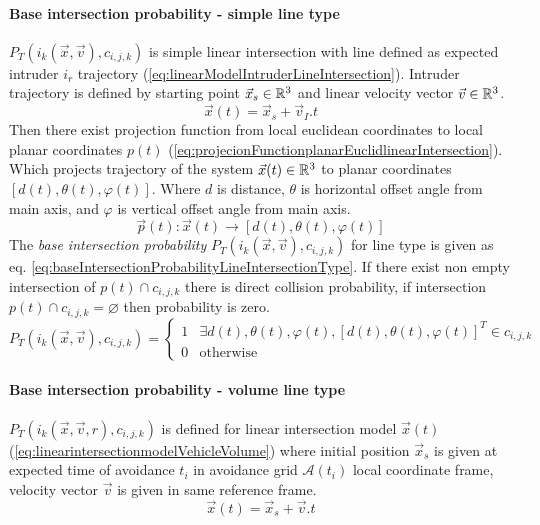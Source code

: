 \paragraph{Base intersection probability - simple line type} $P_T(i_k(\vec{x},\vec{v}),c_{i,j,k})$ is simple linear intersection with line defined as expected intruder $i_r$ trajectory (\ref{eq:linearModelIntruderLineIntersection}). Intruder trajectory is defined by starting point $\vec{x}_s\in\mathbb{R}^3$ and linear velocity vector $\vec{v}\in\mathbb{R}^3$. 
\begin{equation}\label{eq:linearModelIntruderLineIntersection}
    \vec{x}(t)=\vec{x}_s + \vec{v}_I.t
\end{equation}
\noindent Then there exist projection function from local euclidean coordinates to local planar coordinates $p(t)$ (\ref{eq:projecionFunctionplanarEuclidlinearIntersection}). Which projects trajectory of the system $\vec{x}(t)\in\mathbb{R}^3$ to planar coordinates $[d(t),\theta(t),\varphi(t)]$. Where $d$ is distance, $\theta$ is horizontal offset angle from main axis, and $\varphi$ is vertical offset angle from main axis.
\begin{equation}\label{eq:projecionFunctionplanarEuclidlinearIntersection}
    \vec{p}(t):\vec{x}(t)\to[d(t),\theta(t),\varphi(t)]
\end{equation}
\noindent The \emph{base intersection probability} $P_T(i_k(\vec{x},\vec{v}),c_{i,j,k})$ for line type is given as eq. \ref{eq:baseIntersectionProbabilityLineIntersectionType}. If there exist non empty intersection of $p(t)\cap c_{i,j,k}$ there is direct collision probability, if intersection $p(t)\cap c_{i,j,k} = \varnothing$ then probability is zero.
\begin{equation}\label{eq:baseIntersectionProbabilityLineIntersectionType}
    P_T(i_k(\vec{x},\vec{v}),c_{i,j,k})=
    \begin{cases}
        1&\exists d(t),\theta(t),\varphi(t),[d(t),\theta(t),\varphi(t)]^T\in c_{i,j,k}\\
        0&\text{otherwise}
    \end{cases}
\end{equation}

\paragraph{Base intersection probability - volume line type} $P_T(i_k(\vec{x},\vec{v},r),c_{i,j,k})$ is defined for linear intersection model $\vec{x}(t)$ (\ref{eq:linearintersectionmodelVehicleVolume}) where initial position $\vec{x}_s$ is given at expected time of avoidance $t_i$ in avoidance grid $\mathscr{A}(t_i)$ local coordinate frame, velocity vector $\vec{v}$ is given in same reference frame.
\begin{equation}\label{eq:linearintersectionmodelVehicleVolume}
    \vec{x}(t)=\vec{x}_s + \vec{v}.t
\end{equation}

